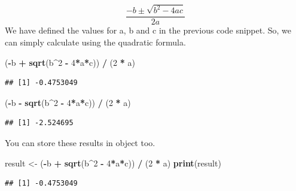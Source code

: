 \documentclass[
]{article}
\newenvironment{Shaded}{\begin{snugshade}}{\end{snugshade}}
\newcommand{\DecValTok}[1]{\textcolor[rgb]{0.00,0.00,0.81}{#1}}
\newcommand{\FunctionTok}[1]{\textcolor[rgb]{0.13,0.29,0.53}{\textbf{#1}}}
\newcommand{\NormalTok}[1]{#1}
\newcommand{\OtherTok}[1]{\textcolor[rgb]{0.56,0.35,0.01}{#1}}
\newcommand{\SpecialCharTok}[1]{\textcolor[rgb]{0.81,0.36,0.00}{\textbf{#1}}}
\begin{document}
\[
\frac{-b \pm \sqrt{b^2 - 4ac}}{2a}
\] We have defined the values for a, b and c in the previous code
snippet. So, we can simply calculate using the quadratic formula.

\begin{Shaded}
\begin{Highlighting}[]
\NormalTok{(}\SpecialCharTok{{-}}\NormalTok{b }\SpecialCharTok{+} \FunctionTok{sqrt}\NormalTok{(b}\SpecialCharTok{\^{}}\DecValTok{2} \SpecialCharTok{{-}} \DecValTok{4}\SpecialCharTok{*}\NormalTok{a}\SpecialCharTok{*}\NormalTok{c)) }\SpecialCharTok{/}\NormalTok{ (}\DecValTok{2} \SpecialCharTok{*}\NormalTok{ a)}
\end{Highlighting}
\end{Shaded}

\begin{verbatim}
## [1] -0.4753049
\end{verbatim}

\begin{Shaded}
\begin{Highlighting}[]
\NormalTok{(}\SpecialCharTok{{-}}\NormalTok{b }\SpecialCharTok{{-}} \FunctionTok{sqrt}\NormalTok{(b}\SpecialCharTok{\^{}}\DecValTok{2} \SpecialCharTok{{-}} \DecValTok{4}\SpecialCharTok{*}\NormalTok{a}\SpecialCharTok{*}\NormalTok{c)) }\SpecialCharTok{/}\NormalTok{ (}\DecValTok{2} \SpecialCharTok{*}\NormalTok{ a)}
\end{Highlighting}
\end{Shaded}

\begin{verbatim}
## [1] -2.524695
\end{verbatim}

You can store these results in object too.

\begin{Shaded}
\begin{Highlighting}[]
\NormalTok{result }\OtherTok{\textless{}{-}}\NormalTok{ (}\SpecialCharTok{{-}}\NormalTok{b }\SpecialCharTok{+} \FunctionTok{sqrt}\NormalTok{(b}\SpecialCharTok{\^{}}\DecValTok{2} \SpecialCharTok{{-}} \DecValTok{4}\SpecialCharTok{*}\NormalTok{a}\SpecialCharTok{*}\NormalTok{c)) }\SpecialCharTok{/}\NormalTok{ (}\DecValTok{2} \SpecialCharTok{*}\NormalTok{ a)}
\FunctionTok{print}\NormalTok{(result)}
\end{Highlighting}
\end{Shaded}

\begin{verbatim}
## [1] -0.4753049
\end{verbatim}
\end{document}
